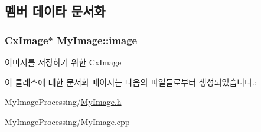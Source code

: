\subsection{멤버 데이타 문서화}
\hypertarget{class_my_image_a8ac6996526b9d73661c339db66680676}{
\subsubsection[{image}]{\setlength{\rightskip}{0pt plus 5cm}Cx\-Image$\ast$ My\-Image\-::image\hspace{0.3cm}{\ttfamily [private]}}}\label{class_my_image_a8ac6996526b9d73661c339db66680676}


이미지를 저장하기 위한 Cx\-Image 



이 클래스에 대한 문서화 페이지는 다음의 파일들로부터 생성되었습니다.\-:\begin{DoxyCompactItemize}
\item 
My\-Image\-Processing/\hyperlink{_my_image_8h}{My\-Image.\-h}\item 
My\-Image\-Processing/\hyperlink{_my_image_8cpp}{My\-Image.\-cpp}\end{DoxyCompactItemize}
